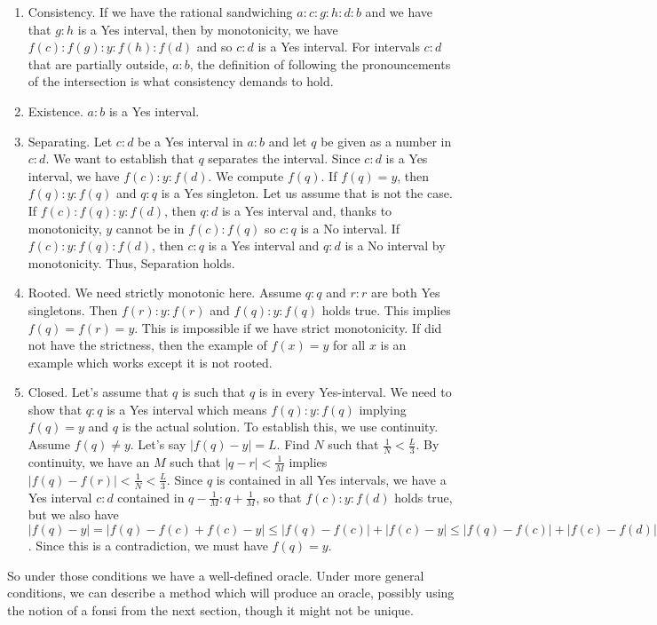 \documentclass[12pt]{article}
\theoremstyle{remark}
\begin{document}
\begin{enumerate}
    \item Consistency. If we have the rational sandwiching $a:c:g:h:d:b$ and we have that $g:h$ is a Yes interval, then by monotonicity, we have $f(c):f(g):y:f(h):f(d)$ and so $c:d$ is a Yes interval. For intervals $c:d$ that are partially outside, $a:b$, the definition of following the pronouncements of the intersection is what consistency demands to hold. 
    \item Existence. $a:b$ is a Yes interval.
    \item Separating. Let $c:d$ be a Yes interval in $a:b$ and let $q$ be given as a number in $c:d$. We want to establish that $q$ separates the interval. Since $c:d$ is a Yes interval, we have $f(c):y:f(d)$. We compute $f(q)$. If $f(q) = y$, then $f(q):y:f(q)$ and $q:q$ is a Yes singleton. Let us assume that is not the case. If $f(c):f(q):y:f(d)$, then $q:d$ is a Yes interval and, thanks to monotonicity, $y$ cannot be in $f(c):f(q)$ so $c:q$ is a No interval. If $f(c):y:f(q):f(d)$, then $c:q$ is a Yes interval and $q:d$ is a No interval by monotonicity. Thus, Separation holds. 
    \item Rooted. We need strictly monotonic here. Assume $q:q$ and $r:r$ are both Yes singletons. Then $f(r):y:f(r)$ and $f(q):y:f(q)$ holds true. This implies $f(q)=f(r)=y$. This is impossible if we have strict monotonicity. If did not have the strictness, then the example of $f(x)=y$ for all $x$ is an example which works except it is not rooted.  
    \item Closed. Let's assume that $q$ is such that $q$ is in every Yes-interval. We need to show that $q:q$ is a Yes interval which means $f(q):y:f(q)$ implying $f(q) =y$ and $q$ is the actual solution. To establish this, we use continuity. Assume $f(q) \neq y$. Let's say $|f(q)  - y| = L$. Find $N$ such that $\frac{1}{N} < \frac{L}{3}$. By continuity, we have an $M$ such that $|q-r|<\frac{1}{M}$ implies $|f(q)-f(r)| < \frac{1}{N} < \frac{L}{3}$. Since $q$ is contained in all Yes intervals, we have a Yes interval $c:d$ contained in $q-\frac{1}{M}:q+\frac{1}{M}$, so that $f(c):y:f(d)$ holds true, but we also have $|f(q)-y| = |f(q) - f(c) + f(c) - y| \leq |f(q)-f(c)| + |f(c)-y| \leq |f(q)-f(c)| + |f(c) - f(d)| \leq |f(q) - f(c) | + |f(c) - f(q)| + |f(q) - f(d)| < L$. Since this is a contradiction, we must have $f(q) = y$.
\end{enumerate}

So under those conditions we have a well-defined oracle. Under more general conditions, we can describe a method which will produce an oracle, possibly using the notion of a fonsi from the next section, though it might not be unique.  
\end{document}
